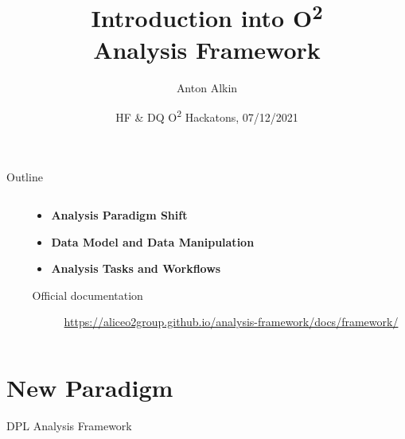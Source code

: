\documentclass[10pt,lualatex,xcolor={table,svgnames},{hyperref={bookmarks=true,linktoc=all}},aspectratio=169]{beamer}
\begin{document}
    \author[Anton Alkin]{Anton Alkin}
    \title{\hspace{3em} Introduction into O\textsuperscript{2} \\ \hspace{3em}  Analysis Framework}
    \date[O\textsuperscript{2} Hackaton, 07/12/2021]{HF \& DQ O\textsuperscript{2} Hackatons, 07/12/2021}

    \begin{frame}{}
        \maketitle
    \end{frame}

    \begin{frame}{Outline}
        \begin{columns}
            \begin{column}{0.1\paperwidth}
            \end{column}
            \begin{column}[c]{0.9\paperwidth}
                \begin{itemize}
                    \item {\huge\bfseries Analysis Paradigm Shift}
                    \item {\huge\bfseries Data Model and Data Manipulation}
                    \item {\huge\bfseries Analysis Tasks and Workflows}
                \end{itemize}
                \vspace{1em}
                {\small
                    \begin{description}
                        \item[Official documentation] \href{https://aliceo2group.github.io/analysis-framework/docs/framework/}{https://aliceo2group.github.io/analysis-framework/docs/framework/}
                \end{description}}
            \end{column}
        \end{columns}
    \end{frame}

    \section{New Paradigm}
    \begin{frame}{DPL Analysis Framework}
        \centering%
        \resizebox{\textwidth}{!}{}
    \end{frame}
\end{document}
